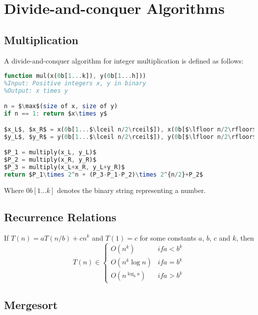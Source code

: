 \section{Divide-and-conquer Algorithms}

\subsection{Multiplication}

\begin{definition}
A divide-and-conquer algorithm for integer multiplication is defined as follows:
\begin{lstlisting}[mathescape=true, language=Octave]
function mul(x(0b[1...k]), y(0b[1...h]))
%Input: Positive integers x, y in binary
%Output: x times y

n = $\max$(size of x, size of y)
if n == 1: return $x\times y$

$x_L$, $x_R$ = x(0b[1...$\lceil n/2\rceil$]), x(0b[$\lfloor n/2\rfloor$...n])
$y_L$, $y_R$ = y(0b[1...$\lceil n/2\rceil$]), y(0b[$\lfloor n/2\rfloor$...n])

$P_1 = multiply(x_L, y_L)$
$P_2 = multiply(x_R, y_R)$
$P_3 = multiply(x_L+x_R, y_L+y_R)$
return $P_1\times 2^n + (P_3-P_1-P_2)\times 2^{n/2}+P_2$
\end{lstlisting}
Where $0b[1...k]$ denotes the binary string representing a number.
\end{definition}

\subsection{Recurrence Relations}

\begin{theorem}
If $T(n) = aT(n/b) + cn^k$ and $T(1) = c$ for some constants $a$, $b$, $c$ and $k$, then
\begin{equation*}
T(n) \in \begin{cases}
O(n^k) &if a<b^k \\
O(n^k\log n) &if a=b^k \\
O(n^{\log_ba}) &if a>b^k
\end{cases}
\end{equation*}
\end{theorem}

\subsection{Mergesort}

